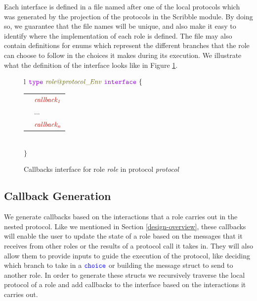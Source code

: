 \documentclass[12pt,twoside]{report}
\begin{document}
Each interface is defined in a file named after one of the local protocols which was generated by the projection of the protocols in the Scribble module. By doing so, we guarantee that the file names will be unique, and also make it easy to identify where the implementation of each role is defined. The file may also contain definitions for enums which represent the different branches that the role can choose to follow in the choices it makes during its execution. We illustrate what the definition of the interface looks like in Figure \ref{callbacks-interface-gen}.\\

\begin{figure}[!h]
    \begin{center}
        \begin{tabular}{l}
            $\gotype\ \interfacename{\localprotocol{role}{protocol}\_\!Env}\ \gointerface\ \{$ \\[3pt]
            \begin{tabular}{ll}
                \indent & $\functionname{callback_1}$\\[3.5pt]
                \indent & ...\\[3.5pt]
                \indent & $\functionname{callback_n}$\\[3.5pt]
            \end{tabular}\\[3pt]
            $\}$
        \end{tabular}

    \end{center}
    \caption{Callbacks interface for role \textit{role} in protocol \textit{protocol}}
    \label{callbacks-interface-gen}
\end{figure}

\subsection{Callback Generation}

We generate callbacks based on the interactions that a role carries out in the nested protocol. Like we mentioned in Section \ref{design-overview}, these callbacks will enable the user to update the state of a role based on the messages that it receives from other roles or the results of a protocol call it takes in. They will also allow them to provide inputs to guide the execution of the protocol, like deciding which branch to take in a ${\color{blue}\mathtt{choice}}$ or building the message struct to send to another role. In order to generate these structs we recursively traverse the local protocol of a role and add callbacks to the interface based on the interactions it carries out.\\
\end{document}
